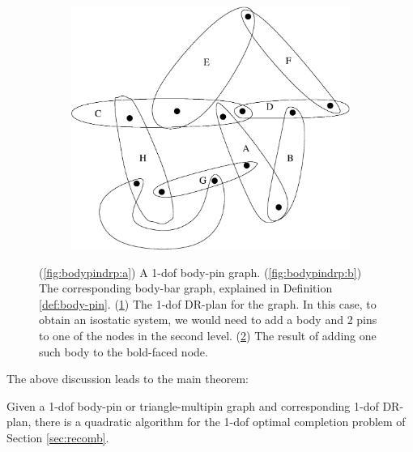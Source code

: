 \begin{figure}
\begin{subfigure}{0.35\linewidth}
        \caption{}\label{fig:bodypindrp:c}
    \end{subfigure}
    \hfill
    \begin{subfigure}{0.2\linewidth}\centering
        \includegraphics[height=\myMinHeight]{img/bodypin2}
        \caption{}\label{fig:bodypindrp:d}
    \end{subfigure}
    \caption{(\ref{fig:bodypindrp:a}) A 1-dof body-pin graph. (\ref{fig:bodypindrp:b}) The corresponding body-bar graph, explained in Definition \ref{def:body-pin}. (\ref{fig:bodypindrp:c}) The 1-dof DR-plan for the graph. In this case, to obtain an isostatic system, we would need to add a body and 2 pins to one of the nodes in the second level. (\ref{fig:bodypindrp:d}) The result of adding one such body to the bold-faced node.}
    \label{fig:bodypindrp}
\end{figure}

The above discussion leads to the main theorem:
\begin{theorem*}
\label{thm:1dofcase}
    Given a 1-dof body-pin or triangle-multipin graph and corresponding 1-dof DR-plan, there is a quadratic algorithm for the 1-dof optimal completion problem of Section \ref{sec:recomb}.
\end{theorem*}


